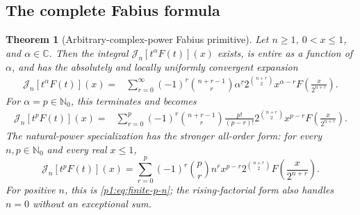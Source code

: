 \documentclass[11pt,oneside]{article}
\newtheorem{theorem}{Theorem}[section]
\theoremstyle{definition}
\theoremstyle{remark}
\newcommand{\C}{\mathbb C}
\newcommand{\N}{\mathbb N}
\newcommand{\fall}[2]{#1^{\underline{#2}}}
\newcommand{\rise}[2]{#1^{\overline{#2}}}
\newcommand{\Jn}{\mathcal J}
\newcommand{\1}{\mathbf 1}
\begin{document}
\subsection{The complete Fabius formula}

\begin{theorem}[Arbitrary-complex-power Fabius primitive]\label{p1:thm:newton-volterra}
Let \(n\geq1\), \(0<x\leq1\), and \(\alpha\in\C\).  Then the integral
\(\Jn_n[t^\alpha F(t)](x)\) exists, is entire as a function of \(\alpha\), and
has the absolutely and locally uniformly convergent expansion
\begin{equation}
 \boxed{\begin{aligned}
 \Jn_n[t^\alpha F(t)](x)
 ={}&\sum_{r=0}^{\infty}(-1)^r\binom{n+r-1}{r}\fall{\alpha}{r}
 2^{\binom{n+r}{2}}x^{\alpha-r}
 F\!\left(\frac{x}{2^{n+r}}\right).
 \end{aligned}}                                                \label{p1:eq:master-alpha-n}
\end{equation}
For \(\alpha=p\in\N_0\), this terminates and becomes
\begin{equation}
 \boxed{\begin{aligned}
 \Jn_n[t^pF(t)](x)
 ={}&\sum_{r=0}^{p}(-1)^r\binom{n+r-1}{r}\frac{p!}{(p-r)!}
 2^{\binom{n+r}{2}}x^{p-r}
 F\!\left(\frac{x}{2^{n+r}}\right).
 \end{aligned}}                                                \label{p1:eq:finite-p-n}
\end{equation}
The natural-power specialization has the stronger all-order form: for every
\(n,p\in\N_0\) and every real \(x\leq1\),
\begin{equation}
 \boxed{\quad
 \Jn_n[t^pF(t)](x)
 =\sum_{r=0}^{p}(-1)^r\binom pr\rise nr x^{p-r}
 2^{\binom{n+r}{2}}F\!\left(\frac{x}{2^{n+r}}\right).
 \quad}                                                       \label{p1:eq:finite-p-n-all-order}
\end{equation}
For positive \(n\), this is \eqref{p1:eq:finite-p-n}; the rising-factorial form
also handles \(n=0\) without an exceptional sum.
\end{theorem}
\end{document}
